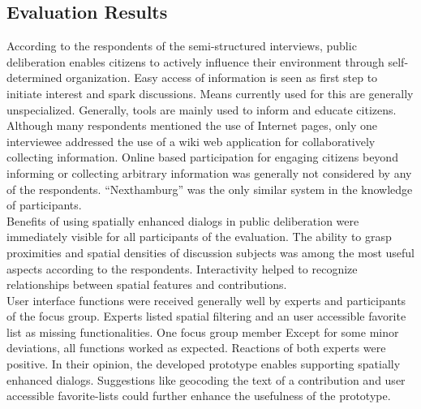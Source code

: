 \subsection{Evaluation Results}
\label{sub:evaluation-results}
According to the respondents of the semi-structured interviews, public deliberation enables citizens to actively influence their environment through self-determined organization. Easy access of information is seen as first step to initiate interest and spark discussions. Means currently used for this are generally unspecialized. Generally, tools are mainly used to inform and educate citizens. Although many respondents mentioned the use of Internet pages, only one interviewee addressed the use of a wiki web application for collaboratively collecting information. Online based participation for engaging citizens beyond informing or collecting arbitrary information was generally not considered by any of the respondents. ``Nexthamburg'' was the only similar system in the knowledge of participants.\\
Benefits of using spatially enhanced dialogs in public deliberation were immediately visible for all participants of the evaluation. The ability to grasp proximities and spatial densities of discussion subjects was among the most useful aspects according to the respondents. Interactivity helped to recognize relationships between spatial features and contributions.\\
User interface functions were received generally well by experts and participants of the focus group. Experts listed spatial filtering and an user accessible favorite list as missing functionalities. One focus group member  Except for some minor deviations, all functions worked as expected. Reactions of both experts were positive. In their opinion, the developed prototype enables supporting spatially enhanced dialogs. Suggestions like geocoding the text of a contribution and user accessible favorite-lists could further enhance the usefulness of the prototype.\\%
